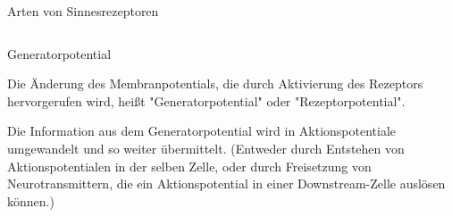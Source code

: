\documentclass[aspectratio=169]{beamer}
\begin{document}
\begin{frame}{Arten von Sinnesrezeptoren}
\begin{columns}[c]
\begin{column}{5cm}
\begin{center}
\end{center}


\end{column}


\end{columns}

\end{frame}





\begin{frame}{Generatorpotential}

Die Änderung des Membranpotentials, die durch Aktivierung des Rezeptors hervorgerufen wird, heißt "Generatorpotential" oder "Rezeptorpotential". 

Die Information aus dem Generatorpotential wird in Aktionspotentiale umgewandelt und so weiter übermittelt. (Entweder durch Entstehen von Aktionspotentialen in der selben Zelle, oder durch Freisetzung von Neurotransmittern, die ein Aktionspotential in einer Downstream-Zelle auslösen können.) 


\end{frame}


\end{document}
